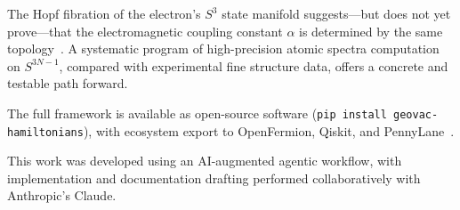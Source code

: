 \documentclass[aps,pra,twocolumn,superscriptaddress,longbibliography]{revtex4-2}
\begin{document}
The Hopf fibration of the electron's $S^3$ state manifold suggests---but
does not yet prove---that the electromagnetic coupling constant $\alpha$
is determined by the same topology~\cite{Paper2}.  A systematic program
of high-precision atomic spectra computation on $S^{3N-1}$, compared
with experimental fine structure data, offers a concrete and testable
path forward.

The full framework is available as open-source software
(\texttt{pip install geovac-hamiltonians}), with ecosystem export to
OpenFermion, Qiskit, and PennyLane~\cite{Paper20}.


\begin{acknowledgments}
This work was developed using an AI-augmented agentic workflow, with
implementation and documentation drafting performed collaboratively
with Anthropic's Claude.
\end{acknowledgments}

\end{document}
